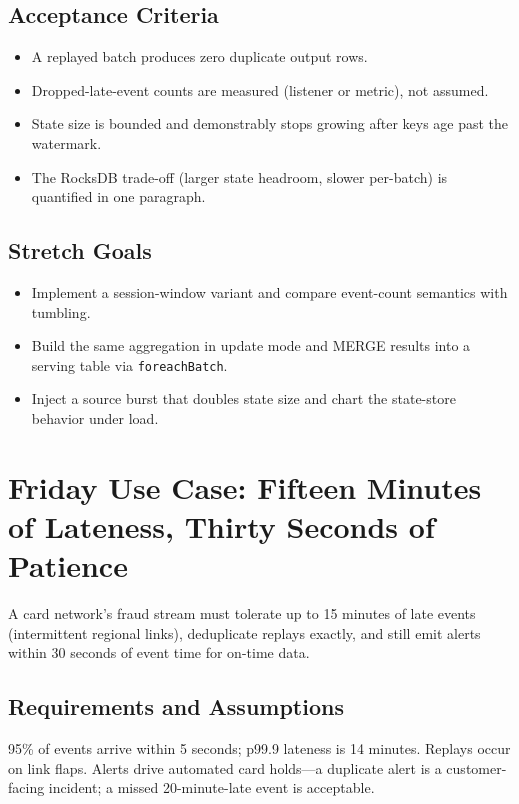 \subsection*{Acceptance Criteria}
\begin{itemize}
    \item A replayed batch produces zero duplicate output rows.
    \item Dropped-late-event counts are measured (listener or metric), not assumed.
    \item State size is bounded and demonstrably stops growing after keys age past the watermark.
    \item The RocksDB trade-off (larger state headroom, slower per-batch) is quantified in one paragraph.
\end{itemize}

\subsection*{Stretch Goals}
\begin{itemize}
    \item Implement a session-window variant and compare event-count semantics with tumbling.
    \item Build the same aggregation in update mode and MERGE results into a serving table via \texttt{foreachBatch}.
    \item Inject a source burst that doubles state size and chart the state-store behavior under load.
\end{itemize}

\section{Friday Use Case: Fifteen Minutes of Lateness, Thirty Seconds of Patience}
A card network's fraud stream must tolerate up to 15 minutes of late events (intermittent regional links), deduplicate replays exactly, and still emit alerts within 30 seconds of event time for on-time data.

\subsection{Requirements and Assumptions}
95\% of events arrive within 5 seconds; p99.9 lateness is 14 minutes. Replays occur on link flaps. Alerts drive automated card holds---a duplicate alert is a customer-facing incident; a missed 20-minute-late event is acceptable.

